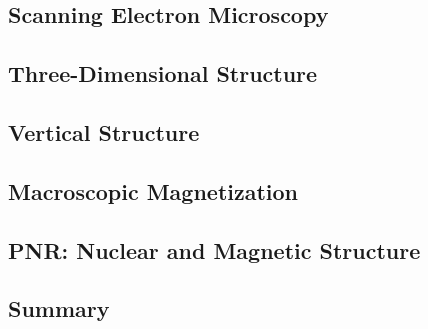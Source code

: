 \documentclass[\main/dresen_thesis.tex]{subfiles}
\renewcommand{\thisPath}{\main/chapters/colloidalCrystals/colloidalCrystals}
\begin{document}
  \subsection{Scanning Electron Microscopy}
  
    \FloatBarrier

  \subsection{Three-Dimensional Structure}
  
    \FloatBarrier

  \subsection{Vertical Structure}
  
    \FloatBarrier

  \subsection{Macroscopic Magnetization}
  
    \FloatBarrier

  \subsection{PNR: Nuclear and Magnetic Structure}
  
    \FloatBarrier

  \clearpage
  \subsection{Summary}
  
    \FloatBarrier
\end{document}
